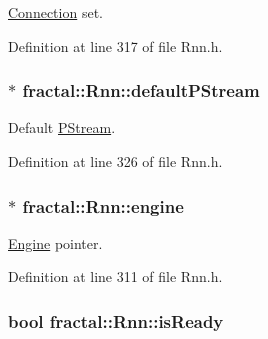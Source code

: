 \hyperlink{classfractal_1_1Connection}{Connection} set. 



Definition at line 317 of file Rnn.\+h.

\hypertarget{classfractal_1_1Rnn_a69ee08dd3cf7e88e99b8138db8cdf8d7}{
\subsubsection[{default\+P\+Stream}]{$\ast$ fractal\+::\+Rnn\+::default\+P\+Stream\hspace{0.3cm}{\ttfamily [protected]}}}\label{classfractal_1_1Rnn_a69ee08dd3cf7e88e99b8138db8cdf8d7}


Default \hyperlink{classfractal_1_1PStream}{P\+Stream}. 



Definition at line 326 of file Rnn.\+h.

\hypertarget{classfractal_1_1Rnn_ae1ab28da171d29e77200295cf86e85f7}{
\subsubsection[{engine}]{$\ast$ fractal\+::\+Rnn\+::engine\hspace{0.3cm}{\ttfamily [protected]}}}\label{classfractal_1_1Rnn_ae1ab28da171d29e77200295cf86e85f7}


\hyperlink{classfractal_1_1Engine}{Engine} pointer. 



Definition at line 311 of file Rnn.\+h.

\hypertarget{classfractal_1_1Rnn_a5d66a5d50e9c7282f467e3e1a947ff17}{
\subsubsection[{is\+Ready}]{\setlength{\rightskip}{0pt plus 5cm}bool fractal\+::\+Rnn\+::is\+Ready\hspace{0.3cm}{\ttfamily [protected]}}}\label{classfractal_1_1Rnn_a5d66a5d50e9c7282f467e3e1a947ff17}


